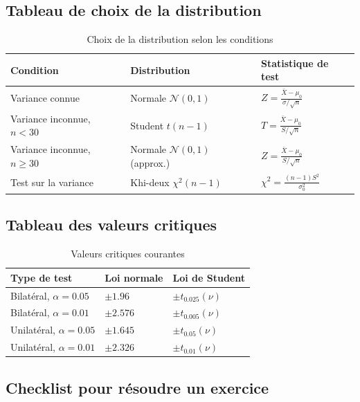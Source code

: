 \documentclass[11pt,a4paper]{article}
\newcommand{\N}{\mathcal{N}}
\newcommand{\chideux}{\chi^2}
\begin{document}
\subsection{Tableau de choix de la distribution}

\begin{table}[h]
\centering
\begin{tabular}{|l|l|l|}
\hline
\textbf{Condition} & \textbf{Distribution} & \textbf{Statistique de test} \\
\hline
Variance connue & Normale $\N(0,1)$ & $Z = \frac{\bar{X} - \mu_0}{\sigma/\sqrt{n}}$ \\
\hline
Variance inconnue, $n < 30$ & Student $t(n-1)$ & $T = \frac{\bar{X} - \mu_0}{S/\sqrt{n}}$ \\
\hline
Variance inconnue, $n \geq 30$ & Normale $\N(0,1)$ (approx.) & $Z = \frac{\bar{X} - \mu_0}{S/\sqrt{n}}$ \\
\hline
Test sur la variance & Khi-deux $\chideux(n-1)$ & $\chideux = \frac{(n-1)S^2}{\sigma_0^2}$ \\
\hline
\end{tabular}
\caption{Choix de la distribution selon les conditions}
\end{table}

\subsection{Tableau des valeurs critiques}

\begin{table}[h]
\centering
\begin{tabular}{|l|l|l|}
\hline
\textbf{Type de test} & \textbf{Loi normale} & \textbf{Loi de Student} \\
\hline
Bilatéral, $\alpha = 0.05$ & $\pm 1.96$ & $\pm t_{0.025}(\nu)$ \\
\hline
Bilatéral, $\alpha = 0.01$ & $\pm 2.576$ & $\pm t_{0.005}(\nu)$ \\
\hline
Unilatéral, $\alpha = 0.05$ & $\pm 1.645$ & $\pm t_{0.05}(\nu)$ \\
\hline
Unilatéral, $\alpha = 0.01$ & $\pm 2.326$ & $\pm t_{0.01}(\nu)$ \\
\hline
\end{tabular}
\caption{Valeurs critiques courantes}
\end{table}

\subsection{Checklist pour résoudre un exercice}
\end{document}
